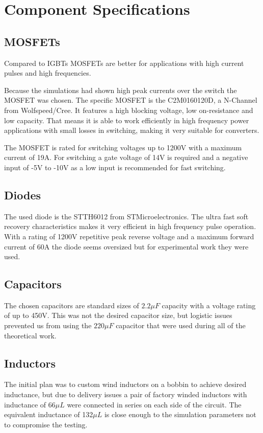 \vspace{-8mm}
\section{Component Specifications}\label{ch:compSpec}
\vspace{-2mm}
\subsection{MOSFETs}
\vspace{-2mm}
Compared to IGBTs MOSFETs are better for applications with high current pulses and high frequencies.\cite{igbtelec63:online}

Because the simulations had shown high peak currents over the switch the MOSFET was chosen.
The specific MOSFET is the C2M0160120D, a N-Channel from Wolfspeed/Cree. 
It features a high blocking voltage, low on-resistance and low capacity.
That means it is able to work efficiently in high frequency power applications with small losses in switching, making it very suitable for converters.

The MOSFET is rated for switching voltages up to 1200V with a maximum current of 19A.
For switching a gate voltage of 14V is required and a negative input of -5V to -10V as a low input is recommended for fast switching.\cite{CreeC2M082:online}
\vspace{-4mm}
\subsection{Diodes}
\vspace{-2mm}
The used diode is the STTH6012 from STMicroelectronics.
The ultra fast soft recovery characteristics makes it very efficient in high frequency pulse operation.
With a rating of 1200V repetitive peak reverse voltage and a maximum forward current of 60A the diode seems oversized but for experimental work they were used.\cite{ST}
\vspace{-4mm}
\subsection{Capacitors}
\vspace{-2mm}
The chosen capacitors are standard sizes of $2.2 \mu F$ capacity with a voltage rating of up to 450V. This was not the desired capacitor size, but logistic issues prevented us from using the $220 \mu F$ capacitor that were used during all of the theoretical work.
\vspace{-4mm}
\subsection{Inductors}
The initial plan was to custom wind inductors on a bobbin to achieve desired inductance, but due to delivery issues a pair of factory winded inductors with inductance of 66$\mu L$ were connected in series on each side of the circuit. The equivalent inductance of 132$\mu L$ is close enough to the simulation parameters not to compromise the testing.